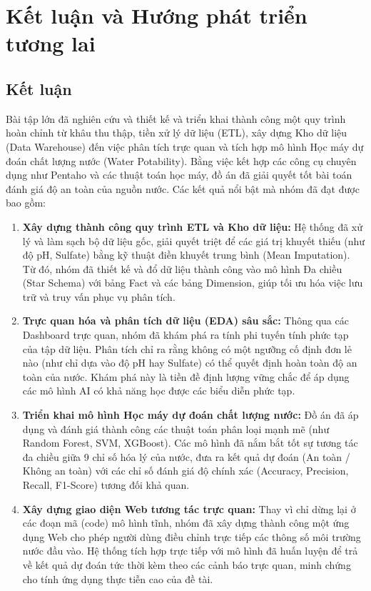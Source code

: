 \section{Kết luận và Hướng phát triển tương lai}

\subsection{Kết luận}
Bài tập lớn đã nghiên cứu và thiết kế và triển khai thành công một quy trình hoàn chỉnh từ khâu thu thập, tiền xử lý dữ liệu (ETL), xây dựng Kho dữ liệu (Data Warehouse) đến việc phân tích trực quan và tích hợp mô hình Học máy dự đoán chất lượng nước (Water Potability). Bằng việc kết hợp các công cụ chuyên dụng như Pentaho và các thuật toán học máy, đồ án đã giải quyết tốt bài toán đánh giá độ an toàn của nguồn nước. Các kết quả nổi bật mà nhóm đã đạt được bao gồm:

\begin{enumerate}[label=\textbf{\arabic*.}]
    \item \textbf{Xây dựng thành công quy trình ETL và Kho dữ liệu:} Hệ thống đã xử lý và làm sạch bộ dữ liệu gốc, giải quyết triệt để các giá trị khuyết thiếu (như độ pH, Sulfate) bằng kỹ thuật điền khuyết trung bình (Mean Imputation). Từ đó, nhóm đã thiết kế và đổ dữ liệu thành công vào mô hình Đa chiều (Star Schema) với bảng Fact và các bảng Dimension, giúp tối ưu hóa việc lưu trữ và truy vấn phục vụ phân tích.
    
    \item \textbf{Trực quan hóa và phân tích dữ liệu (EDA) sâu sắc:} Thông qua các Dashboard trực quan, nhóm đã khám phá ra tính phi tuyến tính phức tạp của tập dữ liệu. Phân tích chỉ ra rằng không có một ngưỡng cố định đơn lẻ nào (như chỉ dựa vào độ pH hay Sulfate) có thể quyết định hoàn toàn độ an toàn của nước. Khám phá này là tiền đề định lượng vững chắc để áp dụng các mô hình AI có khả năng học được các biểu diễn phức tạp.
    
    \item \textbf{Triển khai mô hình Học máy dự đoán chất lượng nước:} Đồ án đã áp dụng và đánh giá thành công các thuật toán phân loại mạnh mẽ (như Random Forest, SVM, XGBoost). Các mô hình đã nắm bắt tốt sự tương tác đa chiều giữa 9 chỉ số hóa lý của nước, đưa ra kết quả dự đoán (An toàn / Không an toàn) với các chỉ số đánh giá độ chính xác (Accuracy, Precision, Recall, F1-Score) tương đối khả quan.
    
    \item \textbf{Xây dựng giao diện Web tương tác trực quan:} Thay vì chỉ dừng lại ở các đoạn mã (code) mô hình tĩnh, nhóm đã xây dựng thành công một ứng dụng Web cho phép người dùng điều chỉnh trực tiếp các thông số môi trường nước đầu vào. Hệ thống tích hợp trực tiếp với mô hình đã huấn luyện để trả về kết quả dự đoán tức thời kèm theo các cảnh báo trực quan, minh chứng cho tính ứng dụng thực tiễn cao của đề tài.
\end{enumerate}

